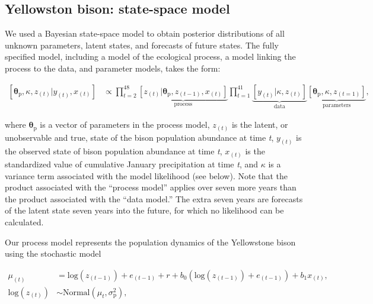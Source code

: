 \documentclass[12pt,]{article}
\begin{document}
\subsection{Yellowston bison: state-space
model}\label{yellowston-bison-state-space-model}

We used a Bayesian state-space model to obtain posterior distributions
of all unknown parameters, latent states, and forecasts of future
states. The fully specified model, including a model of the ecological
process, a model linking the process to the data, and parameter models,
takes the form:

\vspace{-2em}

\begin{align}
\left[ \boldsymbol{\theta}_\text{p}, \kappa, z_{(t)} | y_{(t)}, x_{(t)} \right ] &\propto \prod_{t=2}^{48} \underbrace{\left[ z_{(t)} | \boldsymbol{\theta}_\text{p}, z_{(t-1)}, x_{(t)} \right]}_{\text{process}} \prod_{t=1}^{41} \underbrace{\left[ y_{(t)} | \kappa, z_{(t)} \right]}_{\text{data}} \underbrace{\left[ \boldsymbol{\theta}_\text{p}, \kappa, z_{(t=1)}\right]}_{\text{parameters}},
\end{align}

\noindent{}where \(\boldsymbol{\theta}_\text{p}\) is a vector of
parameters in the process model, \(z_{(t)}\) is the latent, or
unobservable and true, state of the bison population abundance at time
\emph{t}, \(y_{(t)}\) is the observed state of bison population
abundance at time \emph{t}, \(x_{(t)}\) is the standardized value of
cumulative January precipitation at time \emph{t}, and \(\kappa\) is a
variance term associated with the model likelihood (see below). Note
that the product associated with the ``process model'' applies over
seven more years than the product associated with the ``data model.''
The extra seven years are forecasts of the latent state seven years into
the future, for which no likelihood can be calculated.

Our process model represents the population dynamics of the Yellowstone
bison using the stochastic model

\vspace{-2em}

\begin{align}
\mu_{(t)} &= \text{log}(z_{(t-1)}) + e_{(t-1)} + r + b_0 \left( \text{log}(z_{(t-1)}) + e_{(t-1)} \right) + b_1 x_{(t)}, \\
\text{log}(z_{(t)}) &\sim \text{Normal}\left( \mu_t, \sigma^2_\text{p} \right),
\end{align}
\end{document}
